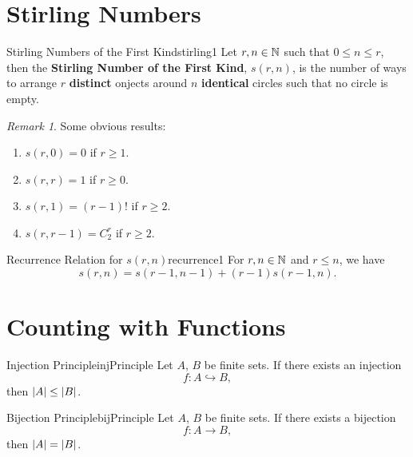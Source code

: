 \documentclass[math]{amznotes}
\theoremstyle{remark}
\newtheorem*{remark}{Remark}
\begin{document}
\section{Stirling Numbers}
\begin{dfnbox}{Stirling Numbers of the First Kind}{stirling1}
    Let $r, n \in \mathbb{N}$ such that $0 \leq n \leq r$, then the {\color{red} \textbf{Stirling Number of the First Kind}}, $s(r, n)$, is the number of ways to arrange $r$ {\color{red} \textbf{distinct}} onjects around $n$ {\color{red} \textbf{identical}} circles such that no circle is empty.
\end{dfnbox}
\begin{notebox}
    \begin{remark}
        Some obvious results:
        \begin{enumerate}
            \item $s(r, 0) = 0$ if $r \geq 1$.
            \item $s(r, r) = 1$ if $r \geq 0$.
            \item $s(r, 1) = (r - 1)!$ if $r \geq 2$.
            \item $s(r, r - 1) = C^r_2$ if $r \geq 2$.
        \end{enumerate}
    \end{remark}
\end{notebox}
\begin{thmbox}{Recurrence Relation for $s(r, n)$}{recurrence1}
    For $r, n \in \mathbb{N}$ and $r \leq n$, we have
    \begin{equation*}
        s(r, n) = s(r - 1, n - 1) + (r - 1)s(r - 1, n).
    \end{equation*}
\end{thmbox}
\section{Counting with Functions}
\begin{thmbox}{Injection Principle}{injPrinciple}
    Let $A$, $B$ be finite sets. If there exists an injection
    \begin{displaymath}
        f \colon A \hookrightarrow B,
    \end{displaymath}
    then ${\left\lvert {A} \right\rvert} \leq {\left\lvert {B} \right\rvert}$.
\end{thmbox}
\begin{thmbox}{Bijection Principle}{bijPrinciple}
    Let $A$, $B$ be finite sets. If there exists a bijection
    \begin{displaymath}
        f \colon A \to B,
    \end{displaymath}
    then ${\left\lvert {A} \right\rvert} = {\left\lvert {B} \right\rvert}$.
\end{thmbox}
\end{document}
